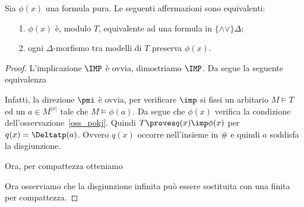 \begin{theorem}\label{qfdefinability}
Sia $\phi(x)$ una formula pura. Le seguenti affermazioni sono equivalenti:
\begin{itemize}
\item[1.] $\phi(x)$ \`e, modulo $T$, equivalente ad una formula in $\{\mathord\wedge\!\mathord\vee\}\Delta$;
\item[2.] ogni $\Delta$-morfismo tra modelli di $T$ preserva $\phi(x)$.
\end{itemize}
\end{theorem}
\begin{proof} L'implicazione $\IMP$ \`e ovvia, dimostriamo $\IMP$. Da  segue la seguente equivalenza



Infatti, la direzione $\pmi$ \`e ovvia, per verificare $\imp$ si fissi un arbitario $M\models T$ ed un $a\in M^{|x|}$ tale che $M\models\phi(a)$.  Da  segue che $\phi(x)$ verifica la condizione  dell'osservazione~\ref{oss_pokj}. Quindi $T\proves q(x)\imp\phi(x)$ per $q(x)=\Deltatp(a)$. Ovvero $q(x)$ occorre nell'insieme in $\#$ e quindi $a$ soddisfa la disgiunzione.

Ora, per compattezza otteniamo


Ora osserviamo che la disgiunzione infinita pu\`o essere sostituita con una finita per compattezza.
\end{proof}
















